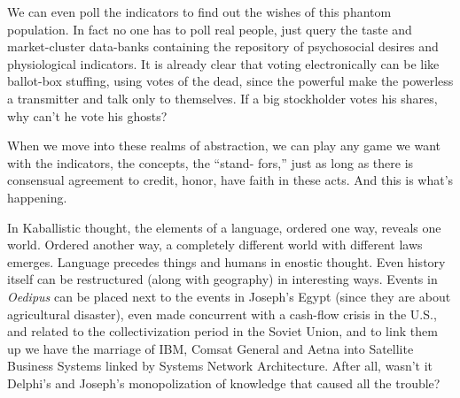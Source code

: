 We can even poll the indicators to find out
the wishes of this phantom population. In
fact no one has to poll real people, just query
the taste and market-cluster data-banks containing the repository of psychosocial desires and physiological indicators. It is already clear that voting electronically can be
like ballot-box stuffing, using votes of the
dead, since the powerful make the powerless
a transmitter and talk only to themselves. If a
big stockholder votes his shares, why can't
he vote his ghosts?

When we move into these realms of abstraction, we can play any game we want
with the indicators, the concepts, the \enquote{stand- fors,} just as long as there is consensual
agreement to credit, honor, have faith in
these acts. And this is what's happening.

In Kaballistic thought, the elements of a
language, ordered one way, reveals one
world. Ordered another way, a completely
different world with different laws emerges.
Language precedes things and humans in
enostic thought. Even history itself can be
restructured (along with geography) in interesting ways. Events in \emph{Oedipus} can be
placed next to the events in Joseph's Egypt
(since they are about agricultural disaster),
even made concurrent with a cash-flow
crisis in the U.S., and related to the collectivization period in the Soviet Union, and
to link them up we have the marriage of IBM,
Comsat General and Aetna into Satellite
Business
Systems linked by Systems Network Architecture. After all, wasn't it Delphi's and Joseph's monopolization of knowledge that caused all the trouble?

